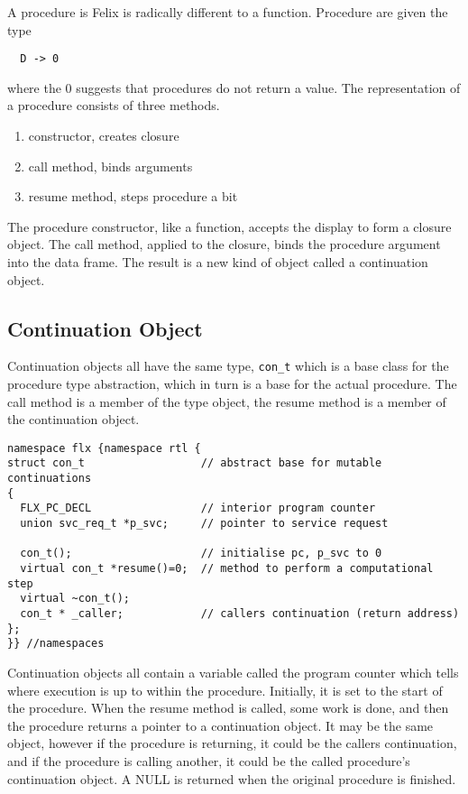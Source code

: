 \documentclass[oneside]{book}
\begin{document}
A procedure is Felix is radically different to a function. Procedure are given the type

\begin{verbatim}
  D -> 0
\end{verbatim}

where the 0 suggests that procedures do not return a value. The representation of a procedure
consists of three methods.

\begin{enumerate}
\item constructor, creates closure
\item call method, binds arguments
\item resume method, steps procedure a bit
\end{enumerate}

The procedure constructor, like a function, accepts the display to form a closure object.
The call method, applied to the closure, binds the procedure argument into the data frame.
The result is a new kind of object called a continuation object.

\subsection{Continuation Object}
Continuation objects all have the same type, \verb$con_t$ which is a base class for
the procedure type abstraction, which in turn is a base for the actual procedure.
The call method is a member of the type object, the resume method is a member
of the continuation object.

\begin{verbatim}
namespace flx {namespace rtl {
struct con_t                  // abstract base for mutable continuations
{
  FLX_PC_DECL                 // interior program counter
  union svc_req_t *p_svc;     // pointer to service request

  con_t();                    // initialise pc, p_svc to 0
  virtual con_t *resume()=0;  // method to perform a computational step
  virtual ~con_t();
  con_t * _caller;            // callers continuation (return address)
};
}} //namespaces
\end{verbatim}

Continuation objects all contain a variable called the program counter which tells
where execution is up to within the procedure. Initially, it is set to the start
of the procedure. When the resume method is called, some work is done, and then
the procedure returns a pointer to a continuation object. It may be the same
object, however if the procedure is returning, it could be the callers continuation,
and if the procedure is calling another, it could be the called procedure's 
continuation object. A NULL is returned when the original procedure is finished.
\end{document}

